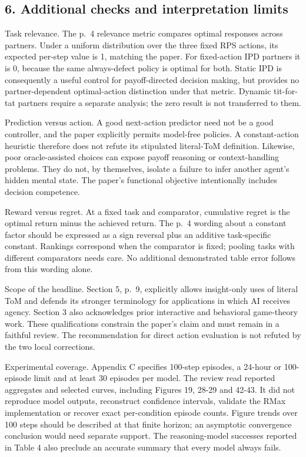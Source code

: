\documentclass[10pt]{article}
\begin{document}
\subsection*{6. Additional checks and interpretation limits}
Task relevance. The p. 4 relevance metric compares optimal responses across partners. Under a uniform distribution over the three fixed RPS actions, its expected per-step value is 1, matching the paper. For fixed-action IPD partners it is 0, because the same always-defect policy is optimal for both. Static IPD is consequently a useful control for payoff-directed decision making, but provides no partner-dependent optimal-action distinction under that metric. Dynamic tit-for-tat partners require a separate analysis; the zero result is not transferred to them.\par
Prediction versus action. A good next-action predictor need not be a good controller, and the paper explicitly permits model-free policies. A constant-action heuristic therefore does not refute its stipulated literal-ToM definition. Likewise, poor oracle-assisted choices can expose payoff reasoning or context-handling problems. They do not, by themselves, isolate a failure to infer another agent’s hidden mental state. The paper’s functional objective intentionally includes decision competence.\par
Reward versus regret. At a fixed task and comparator, cumulative regret is the optimal return minus the achieved return. The p. 4 wording about a constant factor should be expressed as a sign reversal plus an additive task-specific constant. Rankings correspond when the comparator is fixed; pooling tasks with different comparators needs care. No additional demonstrated table error follows from this wording alone.\par
Scope of the headline. Section 5, p. 9, explicitly allows insight-only uses of literal ToM and defends its stronger terminology for applications in which AI receives agency. Section 3 also acknowledges prior interactive and behavioral game-theory work. These qualifications constrain the paper’s claim and must remain in a faithful review. The recommendation for direct action evaluation is not refuted by the two local corrections.\par
Experimental coverage. Appendix C specifies 100-step episodes, a 24-hour or 100-episode limit and at least 30 episodes per model. The review read reported aggregates and selected curves, including Figures 19, 28-29 and 42-43. It did not reproduce model outputs, reconstruct confidence intervals, validate the RMax implementation or recover exact per-condition episode counts. Figure trends over 100 steps should be described at that finite horizon; an asymptotic convergence conclusion would need separate support. The reasoning-model successes reported in Table 4 also preclude an accurate summary that every model always fails.\par
\end{document}
